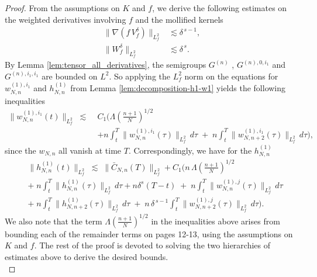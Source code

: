 \documentclass[pdflatex,sn-mathphys-num]{sn-jnl}
\theoremstyle{thmstyleone}%
\theoremstyle{thmstyletwo}%
\theoremstyle{thmstylethree}%
\begin{document}
\begin{proof}
From the assumptions on $K$ and $f$, we derive the following estimates on the weighted derivatives involving $f$ and the mollified kernels
\begin{align*}
    \|\nabla (f\, V_f^\delta)\|_{L^2_f} &\lesssim \delta^{\,s - 1},\\[4pt]
    \|W_f^\delta\|_{L^2_f} &\lesssim \delta^{\,s}.
\end{align*}
By Lemma \ref{lem:tensor_all_derivatives}, the semigroups $G^{(n)}$ , $G^{(n),0,i_1}$ and $G^{(n),i_1,i_1}$ are bounded on $L^2$. So applying the $L^2_f$ norm on the equations for $w_{N,n}^{(1),i_1}$ and $h_{N,n}^{(1)}$ from Lemma \ref{lem:decomposition-h1-w1} yields the following inequalities 
\begin{equation}\label{ineq:w_Nn}
\begin{aligned}
\|w^{(1),i_1}_{N,n}(t)\|_{L^2_f}
\;\lesssim\;&
C_1 \Bigg( \Lambda\!\left(\frac{n+1}{N}\right)^{1/2} \\
\; &+n\!\int_t^T \|w^{(1),i_1}_{N,n}(\tau)\|_{L^2_f}\, d\tau
\;+\;
n\!\int_t^T \|w^{(1),i_1}_{N,n+2}(\tau)\|_{L^2_f}\, d\tau \Bigg),
\end{aligned}
\end{equation}
since the $w_{N,n}$ all vanish at time $T$. Correspondingly, we have for the $h_{N,n}^{(1)}$
\begin{equation}\label{ineq:h_Nn}
\begin{aligned}
&\|h^{(1)}_{N,n}(t)\|_{L^2_f}
\;\lesssim\; \|\bar C_{N,n}(T)\|_{L^2_f}+C_1 \Bigg(
n\,\Lambda\!\left(\frac{n+1}{N}\right)^{1/2}
\\ & +\;
n\!\int_t^T \|h^{(1)}_{N,n}(\tau)\|_{L^2_f}\, d\tau +n\delta^s(T-t)
\;+\;
n\!\int_t^T \|w^{(1),j}_{N,n}(\tau)\|_{L^2_f}\, d\tau \\
&+\;
n\!\int_t^T \|h^{(1)}_{N,n+2}(\tau)\|_{L^2_f}\, d\tau
\;+\;
n\,\delta^{\,s-1}\!\int_t^T \|w^{(1),j}_{N,n+2}(\tau)\|_{L^2_f}\, d\tau \Bigg).
\end{aligned}
\end{equation}
We also note that the term $\Lambda \!\left(\frac{n+1}{N}\right)^{1/2}$ in the inequalities above arises from bounding each of the remainder terms on pages 12-13, using the assumptions on $K$ and $f$.
The rest of the proof is devoted to solving the two hierarchies of estimates above to derive the desired bounds.\\


\end{proof}
\end{document}
